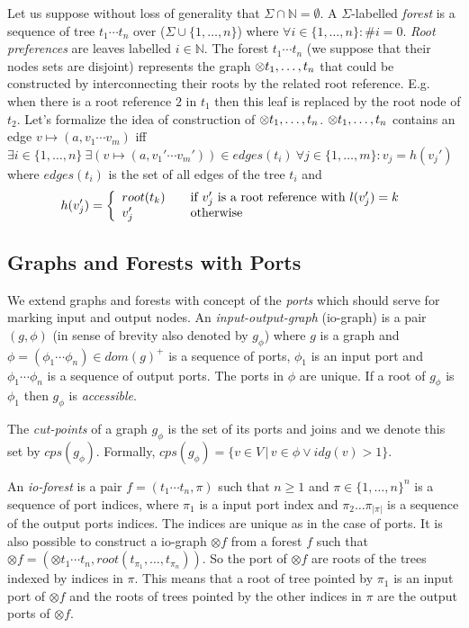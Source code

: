 Let us suppose without loss of generality that $\Sigma \cap \mathbb{N} = \emptyset$.
A $\Sigma$-labelled \emph{forest} is a sequence of tree $t_1 \cdots t_n$ over ($\Sigma \cup \{1,\ldots,n\}$)
where $\forall i \in \{1,\ldots,n\}: \#i = 0$.
\emph{Root preferences} are leaves labelled $i \in \mathbb{N}$.
The forest $t_1 \cdots t_n$ (we suppose that their nodes sets are disjoint) represents the graph $\otimes t_1, \ldots, t_n$ that could
be constructed by interconnecting their roots by the related root reference.
E.g. when there is a root reference $2$ in $t_1$ then this leaf is replaced by the root node of $t_2$.
Let's formalize the idea of construction of $\otimes t_1, \ldots, t_n$.
$\otimes t_1, \ldots, t_n$ contains an edge $v \mapsto (a,v_1 \cdots v_m)$ iff $\exists i \in \{1, \ldots, n\} \ \exists(v \mapsto (a, v_1' \cdots v_m')) \in edges(t_i)
\ \forall j \in \{1,\ldots,m\}: v_j = h(v_j')$ where $edges(t_i)$ is the set of all edges of the tree $t_i$ and
\[ h(v_j') = \left\{
  \begin{array}{l l}
  root(t_k) & \quad \text{if $v_j'$ is a root reference with $l(v_j') = k$}\\
  v_j'   & \quad \text{otherwise}
  \end{array} \right.\]

\subsection{Graphs and Forests with Ports}
\label{subsec:gfp}

We extend graphs and forests with concept of the \emph{ports} which should
serve for marking input and output nodes.
An \emph{input-output-graph} (io-graph) is a pair $(g,\phi)$ (in sense of brevity also denoted by $g_\phi$)
where $g$ is a graph and $\phi=(\phi_1 \cdots \phi_n) \in dom(g)^+$ is a sequence of ports, $\phi_1$
is an input port and $\phi_1 \cdots \phi_n$ is a sequence of output ports.
The ports in $\phi$ are unique.
If a root of $g_\phi$ is $\phi_1$ then $g_\phi$ is \emph{accessible}.

The \emph{cut-points} of a graph $g_\phi$ is the set of its ports and joins and we denote this set by $cps(g_\phi)$.
Formally, $cps(g_\phi)=\{v \in V\,|\, v \in \phi \vee idg(v) > 1\}$.

An \emph{io-forest} is a pair $f=(t_1 \cdots t_n, \pi)$ such that $n \geq 1$ and $\pi \in \{1,\ldots,n\}^n$
is a sequence of port indices, where $\pi_1$ is a input port index and $\pi_2 \ldots \pi_{|\pi|}$ is a sequence
of the output ports indices.
The indices are unique as in the case of ports.
It is also possible to construct a io-graph $\otimes f$ from a forest $f$ such that
$\otimes f = (\otimes t_1 \cdots t_n,root(t_{\pi_{1}},\ldots,t_{\pi_{n}}))$.
So the port of $\otimes f$ are roots of the trees indexed by indices in $\pi$.
This means that a root of tree pointed by $\pi_1$ is an input port of $\otimes f$ and
the roots of trees pointed by the other indices in $\pi$ are the output ports of $\otimes f$.


